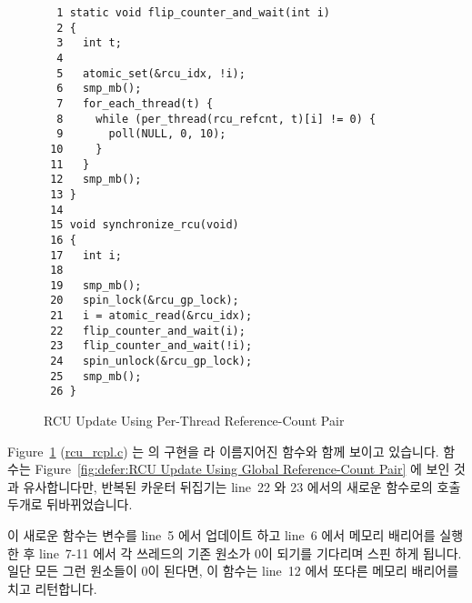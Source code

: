 \begin{figure}[tbp]
{ \scriptsize
\begin{verbatim}
  1 static void flip_counter_and_wait(int i)
  2 {
  3   int t;
  4
  5   atomic_set(&rcu_idx, !i);
  6   smp_mb();
  7   for_each_thread(t) {
  8     while (per_thread(rcu_refcnt, t)[i] != 0) {
  9       poll(NULL, 0, 10);
 10     }
 11   }
 12   smp_mb();
 13 }
 14
 15 void synchronize_rcu(void)
 16 {
 17   int i;
 18
 19   smp_mb();
 20   spin_lock(&rcu_gp_lock);
 21   i = atomic_read(&rcu_idx);
 22   flip_counter_and_wait(i);
 23   flip_counter_and_wait(!i);
 24   spin_unlock(&rcu_gp_lock);
 25   smp_mb();
 26 }
\end{verbatim}
}
\caption{RCU Update Using Per-Thread Reference-Count Pair}
\label{fig:defer:RCU Update Using Per-Thread Reference-Count Pair}
\end{figure}

Figure~\ref{fig:defer:RCU Update Using Per-Thread Reference-Count Pair}
(\url{rcu_rcpl.c})
는  의 구현을  라 이름지어진
함수와 함께 보이고 있습니다.
 함수는
Figure~\ref{fig:defer:RCU Update Using Global Reference-Count Pair} 에 보인
것과 유사합니다만, 반복된 카운터 뒤집기는 line~22 와 23 에서의 새로운 함수로의
호출 두개로 뒤바뀌었습니다.
\iffalse

Figure~\ref{fig:defer:RCU Update Using Per-Thread Reference-Count Pair}
(\url{rcu_rcpl.c})
shows the implementation of \co{synchronize_rcu()}, along with a helper
function named \co{flip_counter_and_wait()}.
The \co{synchronize_rcu()} function resembles that shown in
Figure~\ref{fig:defer:RCU Update Using Global Reference-Count Pair},
except that the repeated counter flip is replaced by a pair of calls
on lines~22 and 23 to the new helper function.
\fi

이 새로운  함수는  변수를 line~5 에서
업데이트 하고 line~6 에서 메모리 배리어를 실행한 후 line~7-11 에서 각 쓰레드의
기존  원소가 0이 되기를 기다리며 스핀 하게 됩니다.
일단 모든 그런 원소들이 0이 된다면, 이 함수는 line~12 에서 또다른 메모리
배리어를 치고 리턴합니다.
\iffalse

The new \co{flip_counter_and_wait()} function updates the
\co{rcu_idx} variable on line~5, executes a memory barrier on line~6,
then lines~7-11 spin on each thread's prior \co{rcu_refcnt} element,
waiting for it to go to zero.
Once all such elements have gone to zero,
it executes another memory barrier on line~12 and returns.
\fi

